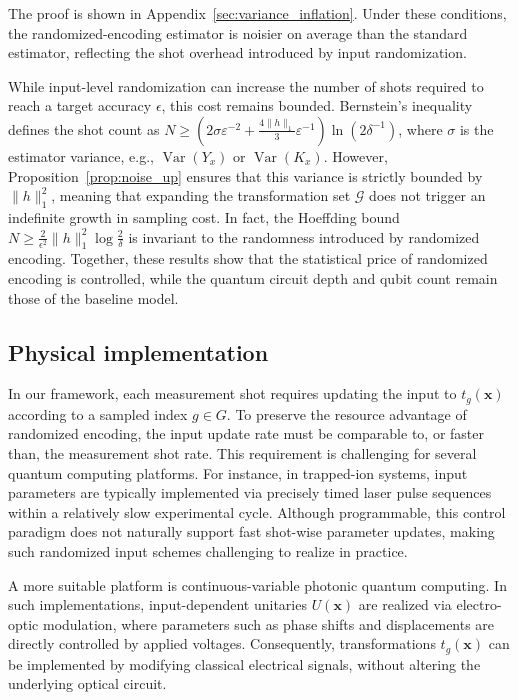 \documentclass[%
 reprint,
 amsmath,amssymb,
 aps,
 pra,
]{revtex4-2}
\theoremstyle{definition}
\begin{document}
The proof is shown in Appendix~\ref{sec:variance_inflation}. Under these conditions, the randomized-encoding estimator is noisier on average than the standard estimator, reflecting the shot overhead introduced by input randomization.

While input-level randomization can increase the number of shots required to reach a target accuracy \(\epsilon\), this cost remains bounded. Bernstein's inequality defines the shot count as \(N \geq \left(2 \sigma \varepsilon^{-2}+\frac{4\|h\|_1}{3}\varepsilon^{-1}\right) \ln( 2\delta^{-1})\), where \(\sigma\) is the estimator variance, e.g., \(\operatorname{Var}(Y_x)\) or \(\operatorname{Var}(K_x)\). However, Proposition~\ref{prop:noise_up} ensures that this variance is strictly bounded by \(\|h\|_1^2\), meaning that expanding the transformation set \(\mathcal{G}\) does not trigger an indefinite growth in sampling cost. In fact, the Hoeffding bound \(N \geq \frac{2}{\epsilon^2}\|h\|_1^2 \log \frac{2}{\delta}\) \cite{Gresch2025} is invariant to the randomness introduced by randomized encoding. Together, these results show that the statistical price of randomized encoding is controlled, while the quantum circuit depth and qubit count remain those of the baseline model.

\subsection{Physical implementation}

In our framework, each measurement shot requires updating the input to \(t_g(\bm{x})\) according to a sampled index \(g \in G\). To preserve the resource advantage of randomized encoding, the input update rate must be comparable to, or faster than, the measurement shot rate. This requirement is challenging for several quantum computing platforms. For instance, in trapped-ion systems, input parameters are typically implemented via precisely timed laser pulse sequences within a relatively slow experimental cycle. Although programmable, this control paradigm does not naturally support fast shot-wise parameter updates, making such randomized input schemes challenging to realize in practice.

A more suitable platform is continuous-variable photonic quantum computing. In such implementations, input-dependent unitaries \(U(\bm{x})\) are realized via electro-optic modulation, where parameters such as phase shifts and displacements are directly controlled by applied voltages. Consequently, transformations \(t_g(\bm{x})\) can be implemented by modifying classical electrical signals, without altering the underlying optical circuit.
\end{document}
